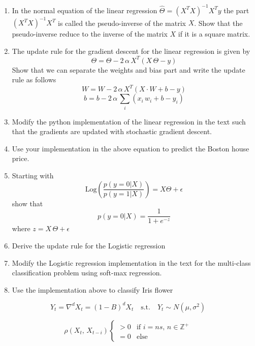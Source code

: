 \documentclass[11pt]{article}
\theoremstyle{definition}
\begin{document}
\begin{enumerate}
    \item In the normal equation of the linear regression $\hat{\Theta} = (X^T X)^{-1} X^T y$ the part $(X^T X)^{-1} X^T$ is called the pseudo-inverse of the matrix $X$. Show that the pseudo-inverse reduce to the inverse of the matrix $X$ if it is a square matrix. 
    
    \item The update rule for the gradient descent for the linear regression is given by 
    $$\Theta =  \Theta -  2\,\alpha \, X^T (X\, \Theta - y) $$
    Show that we can separate the weights and bias part and write the update rule as follows 
    $$ W = W -  2\,\alpha \, X^T (X\cdot W + b - y)  $$
    $$ b =  b -  2\,\alpha \, \sum_i (x_i \, w_i + b - y_i) $$
    
    \item Modify the python implementation of the linear regression in the text such that the gradients are updated with stochastic gradient descent.
    
    \item Use your implementation in the above equation to predict the Boston house price. 
    
    \item Starting with 
    $$
    \text{Log}\left(\frac{p(y=0|X)}{p(y= 1|X)}\right) = X \Theta + \epsilon
    $$
    show that 
    $$
    p(y=0|X) = \frac{1}{1 + e^{-z}}
    $$
    where $z= X \, \Theta + \epsilon $
    
    \item Derive the update rule for the Logistic regression 
    
    \item Modify the Logistic regression implementation in the text for the multi-class classification problem using soft-max regression. 
    
    \item Use the implementation above to classify Iris flower 
    
\end{enumerate}




$$
Y_t = \nabla^d X_t = (1 - B)^d X_t \quad \text{s.t.}\quad Y_t \sim N(\mu, \sigma^2)
$$


$$
\rho(X_t,\, X_{t-i})  \begin{cases}
      > 0 & \text{if $i = n s$,   $n \in \mathbb{Z^{+}}$}\\
      = 0 & \text{else}
    \end{cases} 
$$


$$

$$
\end{document}
